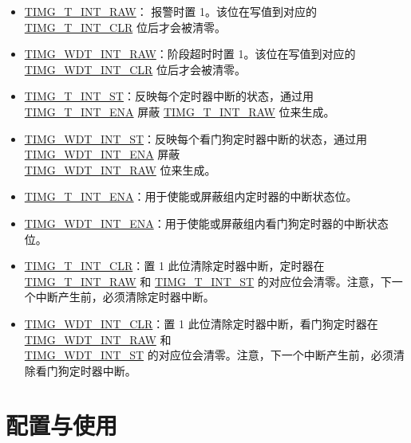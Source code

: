 \documentclass[main\_\_CN.tex]{subfiles}
\begin{document}
\begin{itemize}

\item \hyperref[fielddesc:TIMGTXINTRAW]{TIMG\_T\_INT\_RAW}：
报警时置 1。该位在写值到对应的 \hyperref[fielddesc:TIMGTXINTCLR]{TIMG\_T\_INT\_CLR} 位后才会被清零。
\item \hyperref[fielddesc:TIMGWDTINTRAW]{TIMG\_WDT\_INT\_RAW}：阶段超时时置 1。该位在写值到对应的 \hyperref[fielddesc:TIMGWDTINTCLR]{TIMG\_WDT\_INT\_CLR} 位后才会被清零。
\item \hyperref[fielddesc:TIMGTXINTST]{TIMG\_T\_INT\_ST}：反映每个定时器中断的状态，通过用 \hyperref[fielddesc:TIMGTXINTENA]{TIMG\_T\_INT\_ENA} 屏蔽 \hyperref[fielddesc:TIMGTXINTRAW]{TIMG\_T\_INT\_RAW} 位来生成。
\item \hyperref[fielddesc:TIMGWDTINTST]{TIMG\_WDT\_INT\_ST}：反映每个看门狗定时器中断的状态，通过用 \hyperref[fielddesc:TIMGWDTINTENA]{TIMG\_WDT\_INT\_ENA} 屏蔽 \\\hyperref[fielddesc:TIMGWDTINTRAW]{TIMG\_WDT\_INT\_RAW} 位来生成。
\item \hyperref[fielddesc:TIMGTXINTENA]{TIMG\_T\_INT\_ENA}：用于使能或屏蔽组内定时器的中断状态位。
\item \hyperref[fielddesc:TIMGWDTINTENA]{TIMG\_WDT\_INT\_ENA}：用于使能或屏蔽组内看门狗定时器的中断状态位。
\item \hyperref[fielddesc:TIMGTXINTCLR]{TIMG\_T\_INT\_CLR}：置 1 此位清除定时器中断，定时器在 \hyperref[fielddesc:TIMGTXINTRAW]{TIMG\_T\_INT\_RAW} 和 \hyperref[fielddesc:TIMGTXINTST]{TIMG\_T\_INT\_ST} 的对应位会清零。注意，下一个中断产生前，必须清除定时器中断。
\item \hyperref[fielddesc:TIMGWDTINTCLR]{TIMG\_WDT\_INT\_CLR}：置 1 此位清除定时器中断，看门狗定时器在 \hyperref[fielddesc:TIMGWDTINTRAW]{TIMG\_WDT\_INT\_RAW} 和\\\hyperref[fielddesc:TIMGWDTINTST]{TIMG\_WDT\_INT\_ST} 的对应位会清零。注意，下一个中断产生前，必须清除看门狗定时器中断。
\end{itemize}

\section{配置与使用}
\end{document}
